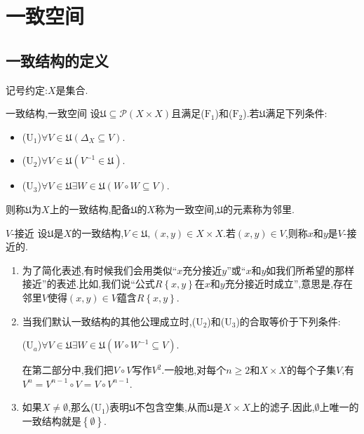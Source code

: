\chapter{一致空间}

\section{一致结构的定义}

记号约定:$X$是集合.

\begin{definition}{一致结构,一致空间}{}
	设$\mathfrak{U}\subseteq\mathcal{P}\left(X\times X\right)$且满足($\mathrm{F}_{1}$)和($\mathrm{F}_{2}$).若$\mathfrak{U}$满足下列条件:
	\begin{itemize}
		\item ($\mathrm{U}_{1}$)$\forall V\in\mathfrak{U}\left(\Delta_{X}\subseteq V\right)$.
		\item ($\mathrm{U}_{2}$)$\forall V\in\mathfrak{U}\left(V^{-1}\in\mathfrak{U}\right)$.
		\item ($\mathrm{U}_{3}$)$\forall V\in\mathfrak{U}\exists W\in\mathfrak{U}\left(W\circ W\subseteq V\right)$.
	\end{itemize}
	则称$\mathfrak{U}$为$X$上的一致结构,配备$\mathfrak{U}$的$X$称为一致空间,$\mathfrak{U}$的元素称为邻里.
\end{definition}

\begin{definition}{$V$-接近}{}
	设$\mathfrak{U}$是$X$的一致结构,$V\in\mathfrak{U},\left(x,y\right)\in X\times X$.若$\left(x,y\right)\in V$,则称$x$和$y$是$V$-接近的.
\end{definition}

\begin{remark}{}{}
	\begin{enumerate}
		\item 为了简化表述,有时候我们会用类似``$x$充分接近$y$''或``$x$和$y$如我们所希望的那样接近''的表述.比如,我们说``公式$R\left\{x,y\right\}$在$x$和$y$充分接近时成立'',意思是,存在邻里$V$使得$\left(x,y\right)\in V$蕴含$R\left\{x,y\right\}$.
		\item 当我们默认一致结构的其他公理成立时,($\mathrm{U}_{2}$)和($\mathrm{U}_{3}$)的合取等价于下列条件:
		\begin{center}
			($\mathrm{U}_{a}$)$\forall V\in\mathfrak{U}\exists W\in\mathfrak{U}\left(W\circ W^{-1}\subseteq V\right)$.
		\end{center}
		在第二部分中,我们把$V\circ V$写作$V^{2}$.一般地,对每个$n\geq 2$和$X\times X$的每个子集$V$,有$V^{n}=V^{n-1}\circ V=V\circ V^{n-1}$.
		\item 如果$X\neq\emptyset$,那么($\mathrm{U}_{1}$)表明$\mathfrak{U}$不包含空集,从而$\mathfrak{U}$是$X\times X$上的滤子.因此,$\emptyset$上唯一的一致结构就是$\left\{\emptyset\right\}$.
	\end{enumerate}
\end{remark}

